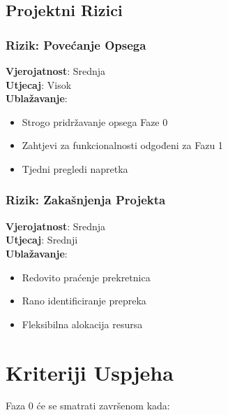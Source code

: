 \documentclass[12pt,a4paper]{article}
\begin{document}
\subsection{Projektni Rizici}

\subsubsection{Rizik: Povećanje Opsega}
\textbf{Vjerojatnost}: Srednja\\
\textbf{Utjecaj}: Visok\\
\textbf{Ublažavanje}:
\begin{itemize}
    \item Strogo pridržavanje opsega Faze 0
    \item Zahtjevi za funkcionalnosti odgođeni za Fazu 1
    \item Tjedni pregledi napretka
\end{itemize}

\subsubsection{Rizik: Zakašnjenja Projekta}
\textbf{Vjerojatnost}: Srednja\\
\textbf{Utjecaj}: Srednji\\
\textbf{Ublažavanje}:
\begin{itemize}
    \item Redovito praćenje prekretnica
    \item Rano identificiranje prepreka
    \item Fleksibilna alokacija resursa
\end{itemize}

\section{Kriteriji Uspjeha}

Faza 0 će se smatrati završenom kada:
\end{document}
